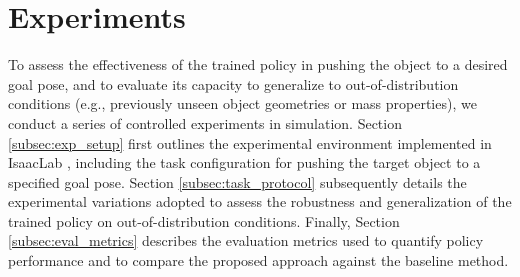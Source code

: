 \section{Experiments}
\label{sec:exp_results}



To assess the effectiveness of the trained policy in pushing the object to a desired goal pose, and to evaluate its capacity to generalize to out-of-distribution conditions (e.g., previously unseen object geometries or mass properties), we conduct a series of controlled experiments in simulation. Section \ref{subsec:exp_setup} first outlines the experimental environment implemented in IsaacLab \cite{Baginski2025IsaacLab}, including the task configuration for pushing the target object to a specified goal pose. Section \ref{subsec:task_protocol} subsequently details the experimental variations adopted to assess the robustness and generalization of the trained policy on out-of-distribution conditions. Finally, Section \ref{subsec:eval_metrics} describes the evaluation metrics used to quantify policy performance and to compare the proposed approach against the baseline method.


